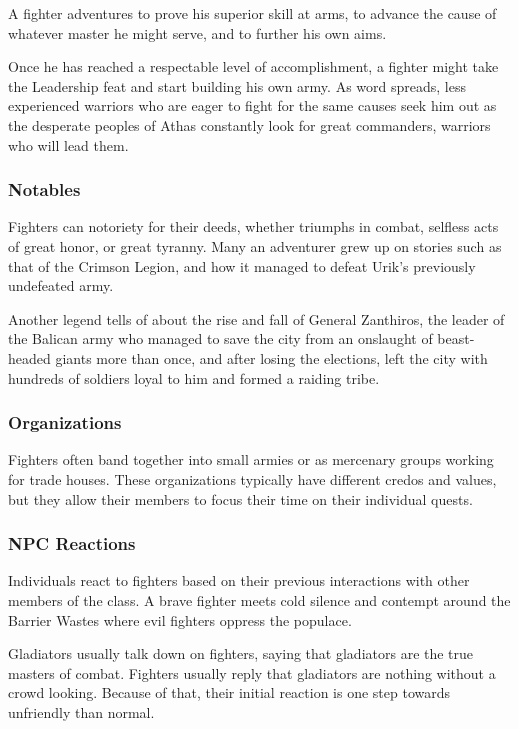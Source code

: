 A fighter adventures to prove his superior skill at arms, to advance the cause of whatever master he might serve, and to further his own aims.

Once he has reached a respectable level of accomplishment, a fighter might take the Leadership feat and start building his own army. As word spreads, less experienced warriors who are eager to fight for the same causes seek him out as the desperate peoples of Athas constantly look for great commanders, warriors who will lead them.

\subsubsection{Notables}

Fighters can notoriety for their deeds, whether triumphs in combat, selfless acts of great honor, or great tyranny. Many an adventurer grew up on stories such as that of the Crimson Legion, and how it managed to defeat Urik's previously undefeated army.

Another legend tells of about the rise and fall of General Zanthiros, the leader of the Balican army who managed to save the city from an onslaught of beast-headed giants more than once, and after losing the elections, left the city with hundreds of soldiers loyal to him and formed a raiding tribe.

\subsubsection{Organizations}

Fighters often band together into small armies or as mercenary groups working for trade houses. These organizations typically have different credos and values, but they allow their members to focus their time on their individual quests.

\subsubsection{NPC Reactions}

Individuals react to fighters based on their previous interactions with other members of the class. A brave fighter meets cold silence and contempt around the Barrier Wastes where evil fighters oppress the populace.

Gladiators usually talk down on fighters, saying that gladiators are the true masters of combat. Fighters usually reply that gladiators are nothing without a crowd looking. Because of that, their initial reaction is one step towards unfriendly than normal.

